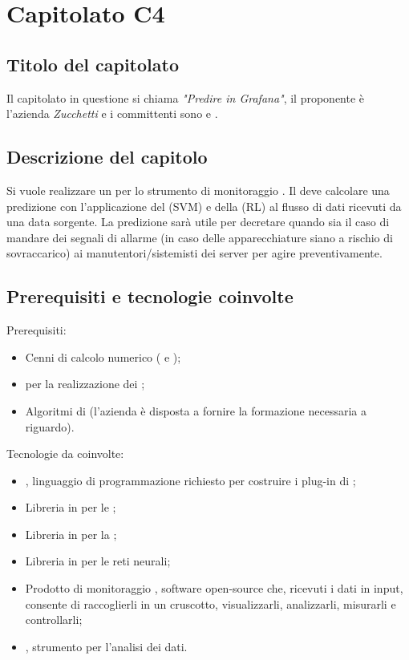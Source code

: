 \section{Capitolato C4}
\subsection{Titolo del capitolato}
Il capitolato in questione si chiama \textit{"Predire in Grafana"}, il proponente è l'azienda \textit{Zucchetti} e i committenti sono \VT{} e \CR{}.

\subsection{Descrizione del capitolo}
Si vuole realizzare un  per lo strumento di monitoraggio . Il  deve calcolare una predizione con l'applicazione del  (SVM) e della  (RL) al flusso di dati ricevuti da una data sorgente. La predizione sarà utile per decretare quando sia il caso di mandare dei segnali di allarme (in caso delle apparecchiature siano a rischio di sovraccarico) ai manutentori/sistemisti dei server per agire preventivamente.

\subsection{Prerequisiti e tecnologie coinvolte}
Prerequisiti:
\begin{itemize}
\item Cenni di calcolo numerico ( e );
\item {} per la realizzazione dei ;
\item Algoritmi di  (l'azienda \`e disposta a fornire la formazione necessaria a riguardo).
\end{itemize}
Tecnologie da coinvolte:
\begin{itemize}
\item {}, linguaggio di programmazione richiesto per costruire i plug-in di ;
\item Libreria in  per le ;
\item Libreria in  per la ;
\item Libreria in  per le reti neurali;
\item Prodotto di monitoraggio , software open-source che, ricevuti i dati in input, consente di raccoglierli in un cruscotto, visualizzarli, analizzarli, misurarli e controllarli;
\item {}, strumento per l'analisi dei dati.
\end{itemize}


